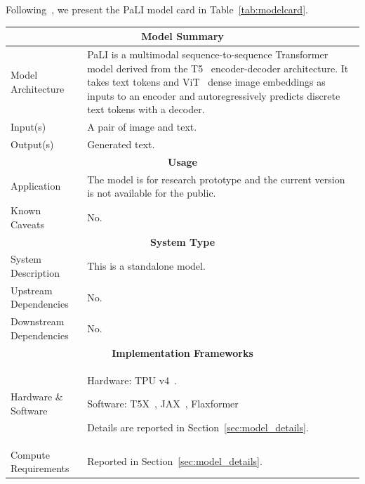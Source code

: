 Following~\cite{mitchell-2019-model}, we present the PaLI model card in Table~\ref{tab:modelcard}. 
\begin{longtable}[c]{ p{} | p{} } 
\toprule
\multicolumn{2}{c}{\textbf{Model Summary}}      \\ \toprule
\multicolumn{1}{l|}{Model Architecture} & PaLI is a multimodal sequence-to-sequence Transformer~\citep{vaswani2017attention} model derived from the T5~\citep{2020t5} encoder-decoder architecture. It takes text tokens and ViT~\citep{dosovitskiy-2021-vit} dense image embeddings as inputs to an encoder and autoregressively predicts discrete text tokens with a decoder.  \\ \midrule
\multicolumn{1}{l|}{Input(s)} & A pair of image and text. 
\\ \midrule
\multicolumn{1}{l|}{Output(s)} & Generated text. 
\\
\toprule

\multicolumn{2}{c}{\textbf{Usage}}      \\ \toprule
\multicolumn{1}{l|}{Application} & The model is for research prototype and the current version is not available for the public.\\ 
\midrule
\multicolumn{1}{l|}{Known Caveats} & No.    \\
\toprule

\multicolumn{2}{c}{\textbf{System Type}}      \\ \toprule
\multicolumn{1}{l|}{System Description} & This is a standalone model.  \\ \midrule
\multicolumn{1}{l|}{Upstream Dependencies} & No.  \\ \midrule
\multicolumn{1}{l|}{Downstream Dependencies} & No. \\
\toprule

\multicolumn{2}{c}{\textbf{Implementation Frameworks}}      \\ \toprule
\multicolumn{1}{l|}{Hardware \& Software} & Hardware: TPU v4~\citep{jouppi2020domain}.    \vspace{0.1in}

Software: T5X~\citep{t5x}, JAX~\citep{jax2018github}, Flaxformer~\citep{flax2020github}    \vspace{0.1in}

Details are reported in Section~\ref{sec:model_details}.
\\ \midrule
\multicolumn{1}{l|}{Compute Requirements} & Reported in Section~\ref{sec:model_details}. \\
\toprule


\end{longtable}
